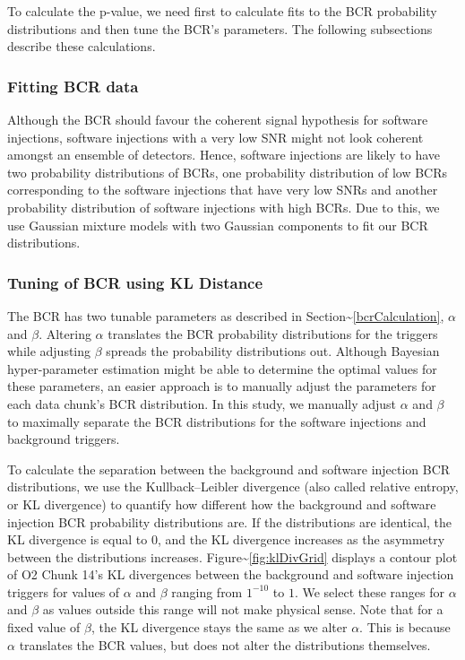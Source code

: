 \documentclass[%
 reprint,
 amsmath,amssymb,
 aps,
]{revtex4}
\begin{document}
To calculate the p-value, we need first to calculate fits to the BCR probability
distributions and then tune the BCR's parameters. The following subsections describe these calculations.

\hypertarget{fitting-bcr-data}{%
\subsubsection{Fitting BCR data}\label{fitting-bcr-data}}

Although the BCR should favour the coherent signal hypothesis for software injections,
software injections with a very low SNR might not look coherent amongst an ensemble of
detectors. Hence, software injections are likely to have two probability distributions
of BCRs, one probability distribution of low BCRs corresponding to the software
injections that have very low SNRs and another probability distribution of software
injections with high BCRs. Due to this, we use Gaussian mixture models with two Gaussian
components to fit our BCR distributions.

\hypertarget{tuning-of-bcr-using-kl-distance}{%
\subsubsection{Tuning of BCR using KL Distance}\label{tuning-of-bcr-using-kl-distance}}

The BCR has two tunable parameters as described in Section\textasciitilde\ref{bcrCalculation},
\(\alpha\) and \(\beta\). Altering \(\alpha\) translates the BCR probability distributions for
the triggers while adjusting \(\beta\) spreads the probability distributions out. Although
Bayesian hyper-parameter estimation might be able to determine the optimal values for
these parameters, an easier approach is to manually adjust the parameters for each data
chunk's BCR distribution. In this study, we manually adjust \(\alpha\) and \(\beta\) to
maximally separate the BCR distributions for the software injections and background
triggers.

To calculate the separation between the background and software injection BCR
distributions, we use the Kullback--Leibler divergence (also called relative entropy, or
KL divergence) to quantify how different how the background and software injection BCR
probability distributions are. If the distributions are identical, the KL divergence is
equal to 0, and the KL divergence increases as the asymmetry between the distributions
increases. Figure\textasciitilde\ref{fig:klDivGrid} displays a contour plot of O2 Chunk 14's KL
divergences between the background and software injection triggers for values of
\(\alpha\) and \(\beta\) ranging from \(1^{-10}\) to \(1\). We select these ranges for \(\alpha\)
and \(\beta\) as values outside this range will not make physical sense. Note that for a
fixed value of \(\beta\), the KL divergence stays the same as we alter \(\alpha\). This is
because \(\alpha\) translates the BCR values, but does not alter the distributions
themselves.
\end{document}
